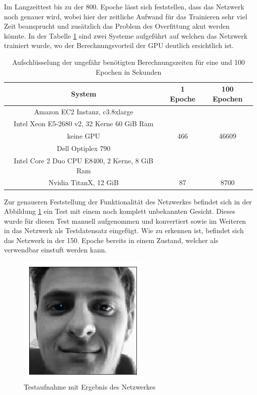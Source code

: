 \noindent
Im Langzeittest bis zu der 800. Epoche lässt sich feststellen, dass das Netzwerk noch genauer wird, wobei hier der zeitliche Aufwand für das Trainieren sehr viel Zeit beansprucht und zusätzlich das Problem des Overfittung akut werden könnte. 
In der Tabelle \ref{tab:time} sind zwei Systeme aufgeführt auf welchen das Netzwerk trainiert wurde, wo der Berechnungsvorteil der GPU deutlich ersichtlich ist. 
\begin{table}[htb]%
\centering%
\begin{tabular}{c c c}
System & 1 Epoche & 100 Epochen \\ 
\hline 
Amazon EC2 Instanz, c3.8xlarge \\ Intel Xeon E5-2680 v2, 32 Kerne 60 GiB Ram \\ keine GPU & 466 & 46609 \\ 
\hline 
Dell Optiplex 790 \\ Intel Core 2 Duo CPU E8400, 2 Kerne, 8 GiB Ram \\ Nvidia TitanX, 12 GiB & 87 & 8700 \\ 
\end{tabular} 
\caption{Aufschlüsselung der ungefähr benötigten Berechnungszeiten für eine und 100 Epochen in Sekunden}
\label{tab:time}
\end{table} \phantom \newline

\noindent
Zur genaueren Feststellung der Funktionalität des Netzwerkes befindet sich in der Abbildung \ref{fig:meTest} ein Test mit einem noch komplett unbekannten Gesicht. 
Dieses wurde für diesen Test manuell aufgenommen und konvertiert sowie im Weiteren in das Netzwerk als Testdatensatz eingefügt. 
Wie zu erkennen ist, befindet sich das Netzwerk in der 150. Epoche bereits in einem Zustand, welcher als verwendbar einstuft werden kann. 
\begin{figure}[ht!]
	\centering
	\includegraphics[scale=0.8]{images/me-test.png}
	\caption{Testaufnahme mit Ergebnis des Netzwerkes}
	\label{fig:meTest}
\end{figure}

